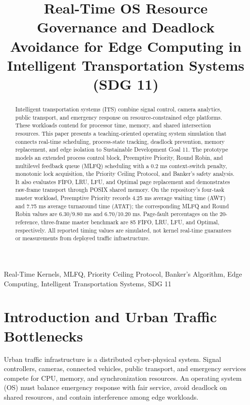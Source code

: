 \documentclass[conference]{IEEEtran}
\title{Real-Time OS Resource Governance and Deadlock Avoidance for Edge Computing in Intelligent Transportation Systems (SDG 11)}
\author{\IEEEauthorblockN{Smart Traffic OS Research Team}
\IEEEauthorblockA{NIET Operating Systems Project\\
Smart Traffic Management System}}
\begin{document}
\maketitle

\begin{abstract}
Intelligent transportation systems (ITS) combine signal control, camera
analytics, public transport, and emergency response on resource-constrained
edge platforms. These workloads contend for processor time, memory, and shared
intersection resources. This paper presents a teaching-oriented operating
system simulation that connects real-time scheduling, process-state tracking,
deadlock prevention, memory replacement, and edge isolation to Sustainable
Development Goal 11. The prototype models an extended process control block,
Preemptive Priority, Round Robin, and multilevel feedback queue (MLFQ)
scheduling with a 0.2 ms context-switch penalty, monotonic lock acquisition,
the Priority Ceiling Protocol, and Banker's safety analysis. It also evaluates
FIFO, LRU, LFU, and Optimal page replacement and demonstrates raw-frame
transport through POSIX shared memory. On the repository's four-task master
workload, Preemptive Priority records 4.25 ms average waiting time (AWT) and
7.75 ms average turnaround time (ATAT); the corresponding MLFQ and Round Robin
values are 6.30/9.80 ms and 6.70/10.20 ms. Page-fault percentages on the
20-reference, three-frame master benchmark are 85%
FIFO, LRU, LFU, and Optimal, respectively. All reported timing values are
simulated, not kernel real-time guarantees or measurements from deployed
traffic infrastructure.
\end{abstract}

\begin{IEEEkeywords}
Real-Time Kernels, MLFQ, Priority Ceiling Protocol, Banker's Algorithm, Edge
Computing, Intelligent Transportation Systems, SDG 11
\end{IEEEkeywords}

\section{Introduction and Urban Traffic Bottlenecks}
Urban traffic infrastructure is a distributed cyber-physical system. Signal
controllers, cameras, connected vehicles, public transport, and emergency
services compete for CPU, memory, and synchronization resources. An operating
system (OS) must balance emergency response with fair service, avoid deadlock
on shared resources, and contain interference among edge workloads.
\end{document}
